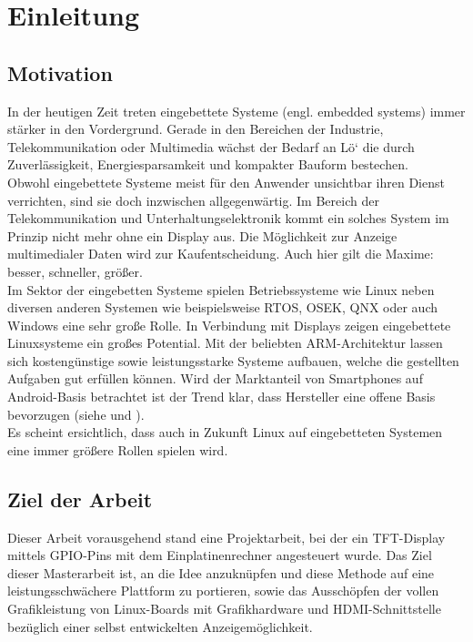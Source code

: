 
\chapter{Einleitung}
\label{cha:Einleitung}

\section{Motivation}
In der heutigen Zeit treten eingebettete Systeme (engl. embedded systems) immer stärker in den Vordergrund. Gerade in den Bereichen der Industrie, Telekommunikation oder Multimedia wächst der Bedarf an Lö` die durch Zuverlässigkeit, Energiesparsamkeit und kompakter Bauform bestechen.\\
Obwohl eingebettete Systeme meist für den Anwender unsichtbar ihren Dienst verrichten, sind sie doch inzwischen allgegenwärtig. Im Bereich der Telekommunikation und Unterhaltungselektronik kommt ein solches System im Prinzip nicht mehr ohne ein Display aus. Die Möglichkeit zur Anzeige multimedialer Daten wird zur Kaufentscheidung. Auch hier gilt die Maxime: besser, schneller, größer.\\
Im Sektor der eingebetten Systeme spielen Betriebssysteme wie Linux neben diversen anderen Systemen wie beispielsweise RTOS, OSEK, QNX oder auch Windows eine sehr große Rolle. In Verbindung mit Displays zeigen eingebettete Linuxsysteme ein großes Potential. Mit der beliebten ARM-Architektur lassen sich kostengünstige sowie leistungsstarke Systeme aufbauen, welche die gestellten Aufgaben gut erfüllen können. Wird der Marktanteil von Smartphones auf Android-Basis betrachtet ist der Trend klar, dass Hersteller eine offene Basis bevorzugen (siehe \cite{android2014} und \cite{Brandt2013}).\\
Es scheint ersichtlich, dass auch in Zukunft Linux auf eingebetteten Systemen eine immer größere Rollen spielen wird. 

\section{Ziel der Arbeit}
Dieser Arbeit vorausgehend stand eine Projektarbeit, bei der ein TFT-Display mittels GPIO-Pins mit dem Einplatinenrechner  angesteuert wurde. Das Ziel dieser Masterarbeit ist, an die Idee anzuknüpfen und diese Methode auf eine leistungsschwächere Plattform zu portieren, sowie das Ausschöpfen der vollen Grafikleistung von Linux-Boards mit Grafikhardware und HDMI-Schnittstelle bezüglich einer selbst entwickelten Anzeigemöglichkeit.
